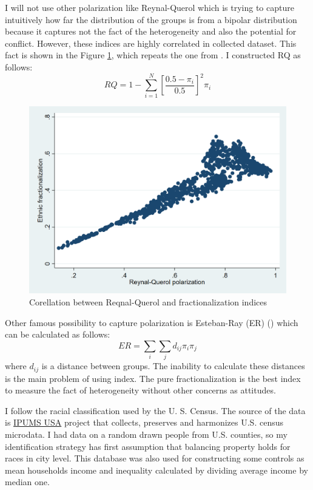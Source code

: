 \documentclass[letterpaper,11pt]{article}
\begin{document}
I will not use other polarization like Reynal-Querol which is trying to capture intuitively how far the distribution of the groups is from a bipolar distribution because it captures not the fact of the heterogeneity and also the potential for conflict. However, these indices are highly correlated in collected dataset. This fact is shown in the Figure \ref{fig:rq-frac}, which repeats the one from \cite{Reynal-Querol}. I constructed RQ as follows:
\begin{equation}
    RQ=1-\sum_{i=1}^{N}\left[\frac{0.5-\pi_{i}}{0.5}\right]^{2} \pi_{i}
\end{equation}

\begin{figure}[h]
    \centering
    \includegraphics[scale = 0.4]{Thesis/Econometrics US/rq - frac.png}
    \caption{Corellation between Reqnal-Querol and fractionalization indices}
    \label{fig:rq-frac}
\end{figure}

Other famous possibility to capture polarization is Esteban-Ray (ER) (\cite{EstebanRay}) which can be calculated as follows:
\[ER = \sum_{i} \sum_{j} d_{ij} \pi_i \pi_j  \]
where $d_{ij}$ is a distance between groups. The inability to calculate these distances is the main problem of using index. The pure fractionalization is the best index to measure the fact of heterogeneity without other concerns as attitudes.

I follow the racial classification used by the U. S. Census. The source of the data is \hyperlink{https://usa.ipums.org/usa/}{IPUMS USA}  project that collects, preserves and harmonizes U.S. census microdata. I had data on a random drawn people from U.S. counties, so my identification strategy has first assumption that balancing property holds for races in city level. This database was also used for constructing some controls as mean households income and inequality calculated by dividing average income by median one.
\end{document}
